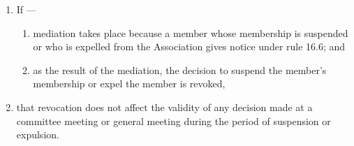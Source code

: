 \documentclass[../constitution.tex]{subfiles}
\begin{document}
\begin{enumerate}

\item If ---

  \begin{enumerate}
  
  \item mediation takes place because a member whose membership is suspended or who is expelled from the Association gives notice under rule 16.6; and
  \item as the result of the mediation, the decision to suspend the member's membership or expel the member is revoked,
  \end{enumerate}
\item that revocation does not affect the validity of any decision made at a committee meeting or general meeting during the period of suspension or expulsion.
\end{enumerate}
\end{document}
